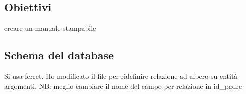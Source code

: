 \subsection*{Obiettivi}


\begin{DoxyItemize}
\item creare un manuale stampabile
\end{DoxyItemize}

\subsection*{Schema del database}

Si usa ferret. Ho modificato il file per ridefinire relazione ad albero su entità argomenti. NB\+: meglio cambiare il nome del campo per relazione in id\+\_\+padre 
